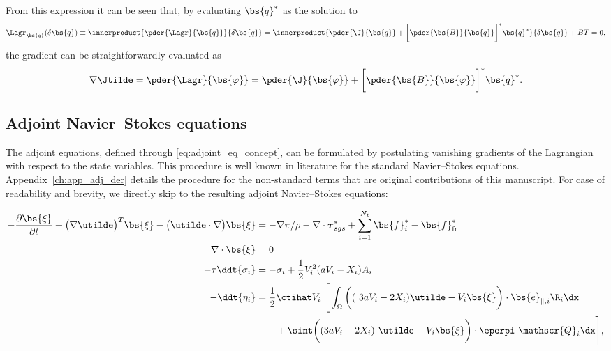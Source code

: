 	From this expression it can be seen that, by evaluating $\bs{q}^*$ as the solution to 
	\begin{equation}
		\Lagr_{\bs{q}}(\delta \bs{q}) \equiv \innerproduct{\pder{\Lagr}{\bs{q}}}{\delta \bs{q}} = \innerproduct{\pder{\J}{\bs{q}} + \bigg[\pder{\bs{B}}{\bs{q}} \bigg]^* \bs{q}^*}{\delta \bs{q}} + BT = 0, \label{eq:adjoint_eq_concept}
	\end{equation}
	the gradient can be straightforwardly evaluated as 
	\begin{equation}
		\nabla \Jtilde = \pder{\Lagr}{\bs{\varphi}} = \pder{\J}{\bs{\varphi}} + \bigg[ \pder{\bs{B}}{\bs{\varphi}}  \bigg]^* \bs{q}^*.\label{eq:adjoint_grad_concept}
	\end{equation} 
	
	\subsection{Adjoint Navier--Stokes equations}\label{sec:problem_adjoint}
	The adjoint equations, defined through \eqref{eq:adjoint_eq_concept}, can be formulated by postulating vanishing gradients of the Lagrangian with respect to the state variables. This procedure is well known in literature for the standard Navier--Stokes equations. Appendix~\ref{ch:app_adj_der} details the procedure for the non-standard terms that are original contributions of this manuscript. For case of readability and brevity, we directly skip to the resulting adjoint Navier--Stokes equations: 
	
	{\small
	\begin{align}
	- \frac{\partial \bs{\xi}}{\partial t} + \big( \nabla \utilde \big)^T \bs{\xi} - \big( \utilde \cdot \nabla \big) \bs{\xi} &= - \nabla \pi / \rho - \nabla \cdot \boldsymbol{\tau}^*_{sgs}  + \sum_{i=1}^{N_t} \bs{f}_i^* + \bs{f}_{\text{fr}}^* \label{eq:adjoint_momentum}\\
	\nabla \cdot \bs{\xi} &= 0 \label{eq:adjoint_continuity}\\
	-\tau \ddt{\sigma_i} &= -\sigma_i + \frac{1}{2} V_i^2  (a V_i - X_i) A_i \label{eq:adjoint_sigma}\\
	- \ddt{\eta_i} &= \frac{1}{2} \ctihat V_i ~ \Bigg[ \int_{\Omega} \bigg((~3aV_i - 2 X_i ) \utilde - V_i \bs{\xi} 
	\bigg) \cdot \bs{e}_{\parallel,i} \R_i \dx \nonumber \\
	& \qquad  + \sint \bigg( (3a V_i - 2 X_i )~\utilde - V_i \bs{\xi} \bigg) \cdot \eperpi ~ \mathscr{Q}_i  \dx \Bigg] \label{eq:adjoint_eta},
	\end{align}
}

